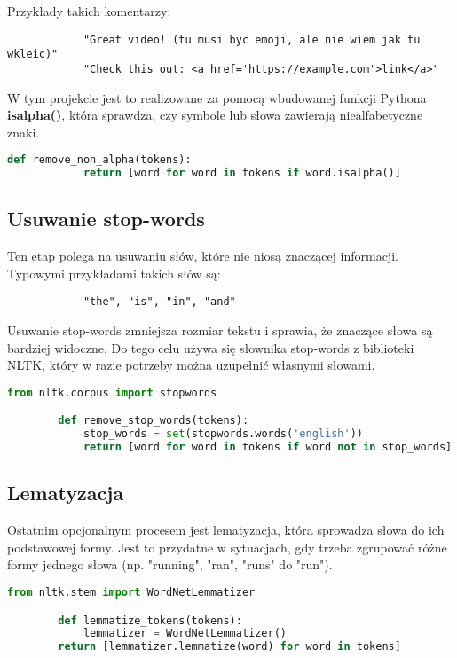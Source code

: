 		Przykłady takich komentarzy:

		\begin{verbatim}
			"Great video! (tu musi byc emoji, ale nie wiem jak tu wkleic)"
			"Check this out: <a href='https://example.com'>link</a>"
		\end{verbatim}
		W tym projekcie jest to realizowane za pomocą wbudowanej funkcji Pythona \textbf{isalpha()}, która sprawdza, czy symbole lub słowa zawierają niealfabetyczne znaki.
		\begin{lstlisting}[language=Python]
			def remove_non_alpha(tokens):
			return [word for word in tokens if word.isalpha()]
		\end{lstlisting}
		
	\subsection{Usuwanie stop-words}
		Ten etap polega na usuwaniu słów, które nie niosą znaczącej informacji. Typowymi przykładami takich słów są:
		\begin{verbatim}
			"the", "is", "in", "and"
		\end{verbatim}
		Usuwanie stop-words zmniejsza rozmiar tekstu i sprawia, że znaczące słowa są bardziej widoczne. Do tego celu używa się słownika stop-words z biblioteki NLTK, który w razie potrzeby można uzupełnić własnymi słowami.
		\begin{lstlisting}[language=Python]
		from nltk.corpus import stopwords

		def remove_stop_words(tokens):
			stop_words = set(stopwords.words('english'))
			return [word for word in tokens if word not in stop_words]
		\end{lstlisting}

	\subsection{Lematyzacja}
		Ostatnim opcjonalnym procesem jest lematyzacja, która sprowadza słowa do ich podstawowej formy. Jest to przydatne w sytuacjach, gdy trzeba zgrupować różne formy jednego słowa (np. "running", "ran", "runs" do "run").

		\begin{lstlisting}[language=Python]
		from nltk.stem import WordNetLemmatizer

		def lemmatize_tokens(tokens):
			lemmatizer = WordNetLemmatizer()
		return [lemmatizer.lemmatize(word) for word in tokens]
		\end{lstlisting}

